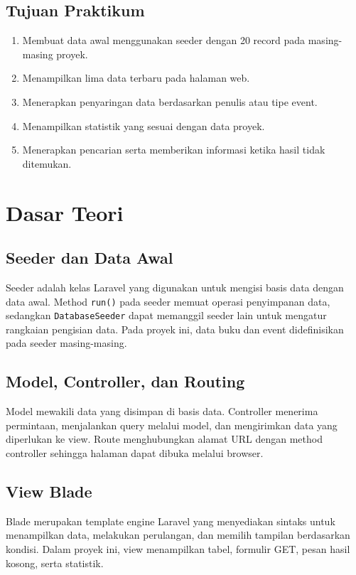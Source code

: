 \documentclass[a4paper,oneside,11pt]{book}
\begin{document}
\section{Tujuan Praktikum}
\begin{enumerate}
  \item Membuat data awal menggunakan seeder dengan 20 record pada masing-masing proyek.
  \item Menampilkan lima data terbaru pada halaman web.
  \item Menerapkan penyaringan data berdasarkan penulis atau tipe event.
  \item Menampilkan statistik yang sesuai dengan data proyek.
  \item Menerapkan pencarian serta memberikan informasi ketika hasil tidak ditemukan.
\end{enumerate}

\chapter{Dasar Teori}
\section{Seeder dan Data Awal}
Seeder adalah kelas Laravel yang digunakan untuk mengisi basis data dengan data awal. Method \texttt{run()} pada seeder memuat operasi penyimpanan data, sedangkan \texttt{DatabaseSeeder} dapat memanggil seeder lain untuk mengatur rangkaian pengisian data. Pada proyek ini, data buku dan event didefinisikan pada seeder masing-masing.\cite{laravel-seeding}

\section{Model, Controller, dan Routing}
Model mewakili data yang disimpan di basis data. Controller menerima permintaan, menjalankan query melalui model, dan mengirimkan data yang diperlukan ke view. Route menghubungkan alamat URL dengan method controller sehingga halaman dapat dibuka melalui browser.\cite{laravel-routing}

\section{View Blade}
Blade merupakan template engine Laravel yang menyediakan sintaks untuk menampilkan data, melakukan perulangan, dan memilih tampilan berdasarkan kondisi. Dalam proyek ini, view menampilkan tabel, formulir GET, pesan hasil kosong, serta statistik.\cite{laravel-blade}
\end{document}
